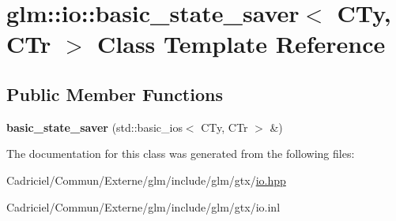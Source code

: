 \hypertarget{classglm_1_1io_1_1basic__state__saver}{}\section{glm\+:\+:io\+:\+:basic\+\_\+state\+\_\+saver$<$ C\+Ty, C\+Tr $>$ Class Template Reference}
\label{classglm_1_1io_1_1basic__state__saver}
\subsection*{Public Member Functions}
\begin{DoxyCompactItemize}
\item 
{\bfseries basic\+\_\+state\+\_\+saver} (std\+::basic\+\_\+ios$<$ C\+Ty, C\+Tr $>$ \&)\hypertarget{classglm_1_1io_1_1basic__state__saver_ab31652b0b7f2a24fa8f9fda2505de356}{}\label{classglm_1_1io_1_1basic__state__saver_ab31652b0b7f2a24fa8f9fda2505de356}

\end{DoxyCompactItemize}


The documentation for this class was generated from the following files\+:\begin{DoxyCompactItemize}
\item 
Cadriciel/\+Commun/\+Externe/glm/include/glm/gtx/\hyperlink{io_8hpp}{io.\+hpp}\item 
Cadriciel/\+Commun/\+Externe/glm/include/glm/gtx/io.\+inl\end{DoxyCompactItemize}
